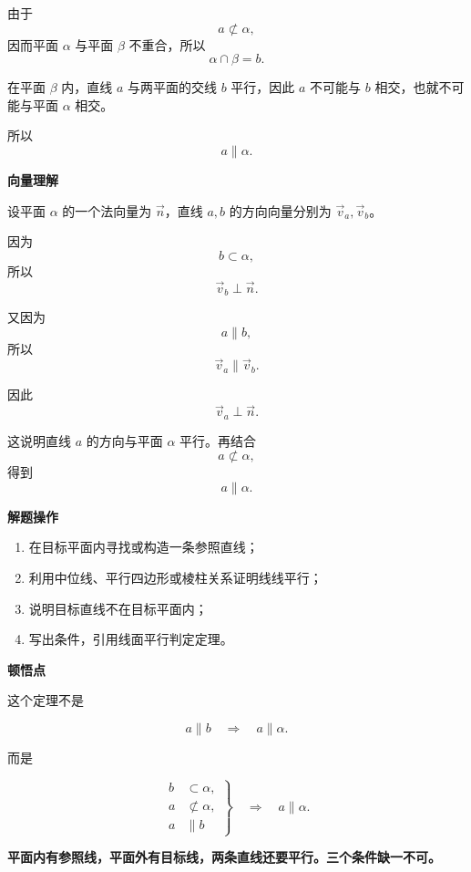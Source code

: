 \begin{explanationbox}
    由于
    \[
        a\not\subset\alpha,
    \]
    因而平面 $\alpha$ 与平面 $\beta$ 不重合，所以
    \[
        \alpha\cap\beta=b.
    \]

    在平面 $\beta$ 内，直线 $a$ 与两平面的交线 $b$ 平行，因此 $a$ 不可能与 $b$ 相交，也就不可能与平面 $\alpha$ 相交。

    所以
    \[
        a\parallel\alpha.
    \]

    \medskip
    \textbf{\textcolor{CExplanation}{向量理解}}

    设平面 $\alpha$ 的一个法向量为 $\vec n$，直线 $a,b$ 的方向向量分别为 $\vec v_a,\vec v_b$。

    因为
    \[
        b\subset\alpha,
    \]
    所以
    \[
        \vec v_b\perp\vec n.
    \]

    又因为
    \[
        a\parallel b,
    \]
    所以
    \[
        \vec v_a\parallel\vec v_b.
    \]

    因此
    \[
        \vec v_a\perp\vec n.
    \]

    这说明直线 $a$ 的方向与平面 $\alpha$ 平行。再结合
    \[
        a\not\subset\alpha,
    \]
    得到
    \[
        a\parallel\alpha.
    \]

    \medskip
    \textbf{\textcolor{CExplanation}{解题操作}}

    \begin{enumerate}[leftmargin=*, itemsep=0.45em, topsep=0.35em]
        \item 在目标平面内寻找或构造一条参照直线；
        \item 利用中位线、平行四边形或棱柱关系证明线线平行；
        \item 说明目标直线不在目标平面内；
        \item 写出条件，引用线面平行判定定理。
    \end{enumerate}

    \medskip
    \textbf{\textcolor{CExplanation}{顿悟点}}

    这个定理不是

    \[
        a\parallel b
        \quad\Longrightarrow\quad
        a\parallel\alpha.
    \]

    而是

    \[
        \left.
        \begin{aligned}
            b &\subset\alpha,\\
            a &\not\subset\alpha,\\
            a &\parallel b
        \end{aligned}
        \right\}
        \quad\Longrightarrow\quad
        a\parallel\alpha.
    \]

    \textbf{平面内有参照线，平面外有目标线，两条直线还要平行。三个条件缺一不可。}
\end{explanationbox}